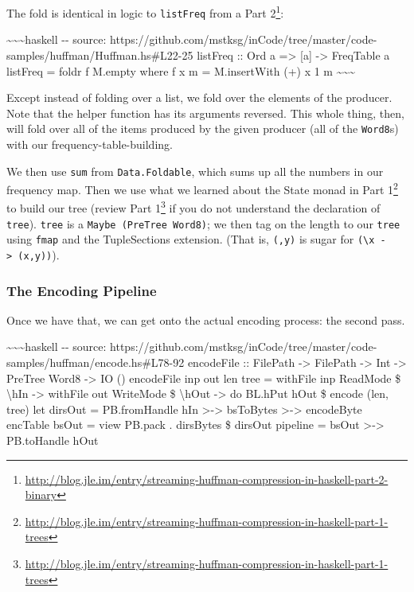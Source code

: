 \documentclass[]{article}
\renewcommand{\href}[2]{#2\footnote{\url{#1}}}
\begin{document}
The fold is identical in logic to \texttt{listFreq} from a
\href{http://blog.jle.im/entry/streaming-huffman-compression-in-haskell-part-2-binary}{Part
2}:

\textasciitilde{}\textasciitilde{}\textasciitilde{}haskell -\/- source:
https://github.com/mstksg/inCode/tree/master/code-samples/huffman/Huffman.hs\#L22-25
listFreq :: Ord a =\textgreater{} {[}a{]} -\textgreater{} FreqTable a listFreq =
foldr f M.empty where f x m = M.insertWith (+) x 1 m
\textasciitilde{}\textasciitilde{}\textasciitilde{}

Except instead of folding over a list, we fold over the elements of the
producer. Note that the helper function has its arguments reversed. This whole
thing, then, will fold over all of the items produced by the given producer (all
of the \texttt{Word8}s) with our frequency-table-building.

We then use \texttt{sum} from \texttt{Data.Foldable}, which sums up all the
numbers in our frequency map. Then we use what we learned about the State monad
in
\href{http://blog.jle.im/entry/streaming-huffman-compression-in-haskell-part-1-trees}{Part
1} to build our tree (review
\href{http://blog.jle.im/entry/streaming-huffman-compression-in-haskell-part-1-trees}{Part
1} if you do not understand the declaration of \texttt{tree}). \texttt{tree} is
a \texttt{Maybe\ (PreTree\ Word8)}; we then tag on the length to our
\texttt{tree} using \texttt{fmap} and the TupleSections extension. (That is,
\texttt{(,y)} is sugar for
\texttt{(\textbackslash{}x\ -\textgreater{}\ (x,y))}).

\subsubsection{The Encoding Pipeline}

Once we have that, we can get onto the actual encoding process: the second pass.

\textasciitilde{}\textasciitilde{}\textasciitilde{}haskell -\/- source:
https://github.com/mstksg/inCode/tree/master/code-samples/huffman/encode.hs\#L78-92
encodeFile :: FilePath -\textgreater{} FilePath -\textgreater{} Int
-\textgreater{} PreTree Word8 -\textgreater{} IO () encodeFile inp out len tree
= withFile inp ReadMode \$ \textbackslash{}hIn -\textgreater{} withFile out
WriteMode \$ \textbackslash{}hOut -\textgreater{} do BL.hPut hOut \$ encode
(len, tree) let dirsOut = PB.fromHandle hIn \textgreater{}-\textgreater{}
bsToBytes \textgreater{}-\textgreater{} encodeByte encTable bsOut = view PB.pack
. dirsBytes \$ dirsOut pipeline = bsOut \textgreater{}-\textgreater{}
PB.toHandle hOut
\end{document}
